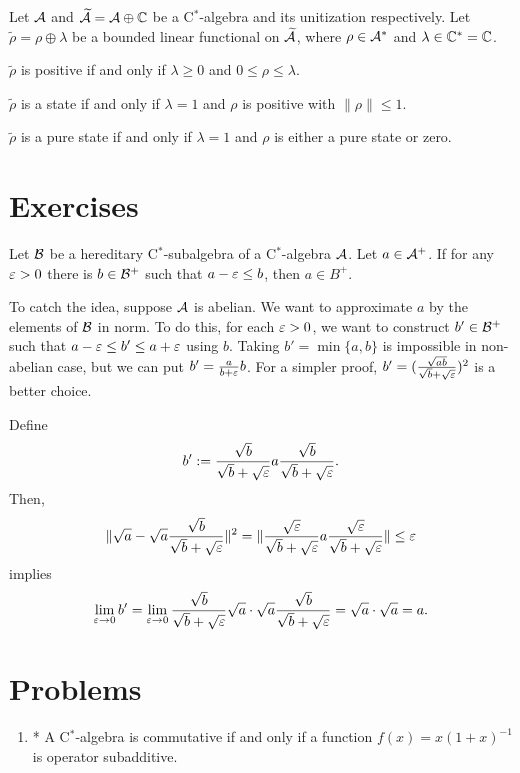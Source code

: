 \documentclass{../note}
\begin{document}
\begin{prb}
Let $\mathcal{A}$ and $\widetilde{\mathcal{A}}=\mathcal{A}\oplus\mathbb{C}$ be a C$^*$-algebra and its unitization respectively.
Let $\tilde\rho=\rho\oplus\lambda$ be a bounded linear functional on $\widetilde{\mathcal{A}}$, where $\rho\in\mathcal{A}^*$ and $\lambda\in\mathbb{C}^*=\mathbb{C}$.
\begin{parts}
\item $\tilde\rho$ is positive if and only if $\lambda\ge0$ and $0\le\rho\le\lambda$.
\item $\tilde\rho$ is a state if and only if $\lambda=1$ and $\rho$ is positive with $\|\rho\|\le1$.
\item $\tilde\rho$ is a pure state if and only if $\lambda=1$ and $\rho$ is either a pure state or zero.
\end{parts}
\end{prb}





\section*{Exercises}


\begin{prb}
Let $\mathcal{B}$ be a hereditary C$^*$-subalgebra of a C$^*$-algebra $\mathcal{A}$.
Let $a\in\mathcal{A}^+$.
If for any $\varepsilon>0$ there is $b\in\mathcal{B}^+$ such that $a-\varepsilon\le b$, then $a\in B^+$.
\end{prb}
\begin{pf}
To catch the idea, suppose $\mathcal{A}$ is abelian.
We want to approximate $a$ by the elements of $\mathcal{B}$ in norm.
To do this, for each $\varepsilon>0$, we want to construct $b'\in\mathcal{B}^+$ such that $a-\varepsilon\le b'\le a+\varepsilon$ using $b$.
Taking $b'=\min\{a,b\}$ is impossible in non-abelian case, but we can put $b'=\frac a{b+\varepsilon}b$.
For a simpler proof, $b'=(\frac{\sqrt{ab}}{\sqrt b+\sqrt{\varepsilon}})^2$ is a better choice.

Define
\[b':=\frac{\sqrt b}{\sqrt b+\sqrt{\varepsilon}}a\frac{\sqrt b}{\sqrt b+\sqrt{\varepsilon}}.\]
Then,
\[\|\sqrt a-\sqrt a\frac{\sqrt b}{\sqrt b+\sqrt{\varepsilon}}\|^2=\|\frac{\sqrt{\varepsilon}}{\sqrt b+\sqrt{\varepsilon}}a\frac{\sqrt{\varepsilon}}{\sqrt b+\sqrt{\varepsilon}}\|\le\varepsilon\]
implies
\[\lim_{\varepsilon\to0}b'=\lim_{\varepsilon\to0}\frac{\sqrt b}{\sqrt b+\sqrt{\varepsilon}}\sqrt a\cdot\sqrt a\frac{\sqrt b}{\sqrt b+\sqrt{\varepsilon}}=\sqrt a\cdot\sqrt a=a.\]
\end{pf}

\section*{Problems}
\begin{enumerate}
\item* A C$^*$-algebra is commutative if and only if a function $f(x)=x(1+x)^{-1}$ is operator subadditive.
\end{enumerate}
\end{document}
